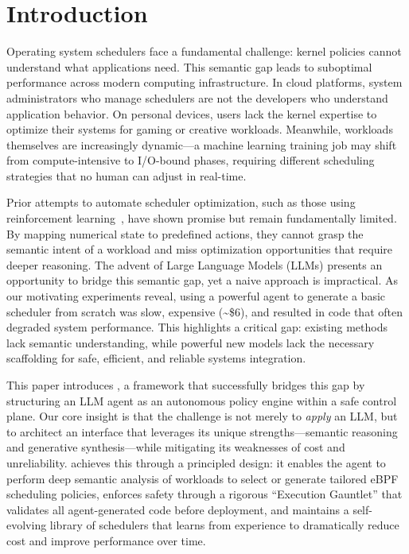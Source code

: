 \section{Introduction}
\label{sec:intro}

Operating system schedulers face a fundamental challenge: kernel policies cannot understand what applications need. This semantic gap leads to suboptimal performance across modern computing infrastructure. In cloud platforms, system administrators who manage schedulers are not the developers who understand application behavior. On personal devices, users lack the kernel expertise to optimize their systems for gaming or creative workloads. Meanwhile, workloads themselves are increasingly dynamic—a machine learning training job may shift from compute-intensive to I/O-bound phases, requiring different scheduling strategies that no human can adjust in real-time.

Prior attempts to automate scheduler optimization, such as those using reinforcement learning~\cite{mao2019decima, qiu2020firm}, have shown promise but remain fundamentally limited. By mapping numerical state to predefined actions, they cannot grasp the semantic intent of a workload and miss optimization opportunities that require deeper reasoning. The advent of Large Language Models (LLMs) presents an opportunity to bridge this semantic gap, yet a naive approach is impractical. As our motivating experiments reveal, using a powerful agent to generate a basic scheduler from scratch was slow, expensive (\textasciitilde\$6), and resulted in code that often degraded system performance. This highlights a critical gap: existing methods lack semantic understanding, while powerful new models lack the necessary scaffolding for safe, efficient, and reliable systems integration.

This paper introduces \sys, a framework that successfully bridges this gap by structuring an LLM agent as an autonomous policy engine within a safe control plane. Our core insight is that the challenge is not merely to \emph{apply} an LLM, but to architect an interface that leverages its unique strengths—semantic reasoning and generative synthesis—while mitigating its weaknesses of cost and unreliability. \sys achieves this through a principled design: it enables the agent to perform deep semantic analysis of workloads to select or generate tailored eBPF scheduling policies, enforces safety through a rigorous ``Execution Gauntlet'' that validates all agent-generated code before deployment, and maintains a self-evolving library of schedulers that learns from experience to dramatically reduce cost and improve performance over time.

